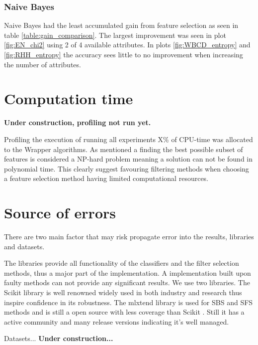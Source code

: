 

\subsubsection{Naive Bayes}

Naive Bayes had the least accumulated gain from feature selection as seen in table \ref{table:gain_comparison}. The largest improvement was seen in plot \ref{fig:EN_chi2} using 2 of 4 available attributes. In plots \ref{fig:WBCD_entropy} and \ref{fig:RHH_entropy} the accuracy sees little to no improvement when increasing the number of attributes.




\section{Computation time}

\textbf{Under construction, profiling not run yet.}

Profiling the execution of running all experiments X\% of CPU-time was allocated to the Wrapper algorithms. As mentioned a finding the best possible subset of features is considered a NP-hard problem meaning a solution can not be found in polynomial time. This clearly suggest favouring filtering methods when choosing a feature selection method having limited computational resources.

\section{Source of errors}
\label{sec:source_of_errors}

There are two main factor that may risk propagate error into the results, libraries and datasets.

The libraries provide all functionality of the classifiers and the filter selection methods, thus a major part of the implementation. A implementation built upon faulty methods can not provide any significant results. We use two libraries. The Scikit library \parencite{scikit-learn} is well renowned widely used in both industry and research thus inspire confidence in its robustness. The mlxtend library is used for SBS and SFS methods and is still a open source with less coverage than Scikit \parencite{mlextend}. Still it has a active community and many release versions indicating it's well managed.

Datasets... \textbf{Under construction...}

